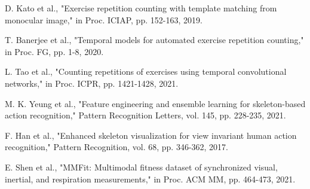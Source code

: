 \documentclass[conference]{IEEEtran}
\begin{document}
\begin{thebibliography}{00}
 D. Kato et al., "Exercise repetition counting with template matching from monocular image," in Proc. ICIAP, pp. 152-163, 2019.

 T. Banerjee et al., "Temporal models for automated exercise repetition counting," in Proc. FG, pp. 1-8, 2020.

 L. Tao et al., "Counting repetitions of exercises using temporal convolutional networks," in Proc. ICPR, pp. 1421-1428, 2021.

 M. K. Yeung et al., "Feature engineering and ensemble learning for skeleton-based action recognition," Pattern Recognition Letters, vol. 145, pp. 228-235, 2021.

 F. Han et al., "Enhanced skeleton visualization for view invariant human action recognition," Pattern Recognition, vol. 68, pp. 346-362, 2017.

 E. Shen et al., "MMFit: Multimodal fitness dataset of synchronized visual, inertial, and respiration measurements," in Proc. ACM MM, pp. 464-473, 2021.

\end{thebibliography}
\end{document}
